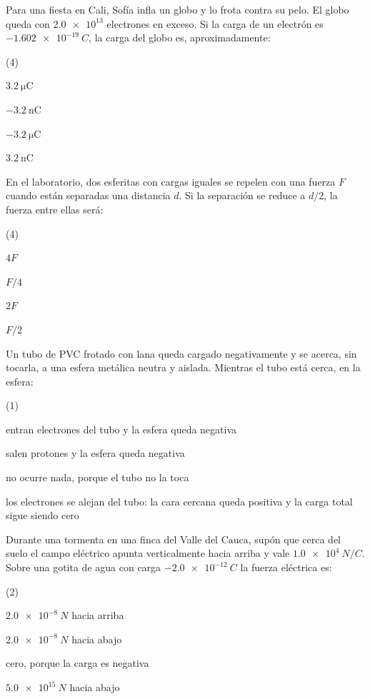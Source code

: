 \documentclass[11pt]{article}
\begin{document}
\begin{preguntas}
\pregunta Para una fiesta en Cali, Sofía infla un globo y lo frota contra su
pelo. El globo queda con $\num{2,0e13}$ electrones en exceso. Si la carga de
un electrón es $\qty{-1,602e-19}{C}$, la carga del globo es,
aproximadamente:
\begin{opciones*}(4)
  \item $\qty{3,2}{\micro\coulomb}$
  \item $\qty{-3,2}{\nano\coulomb}$
  \item $\qty{-3,2}{\micro\coulomb}$
  \item $\qty{3,2}{\nano\coulomb}$
\end{opciones*}

\pregunta En el laboratorio, dos esferitas con cargas iguales se repelen con
una fuerza $F$ cuando están separadas una distancia $d$. Si la separación se
reduce a $d/2$, la fuerza entre ellas será:
\begin{opciones*}(4)
  \item $4F$
  \item $F/4$
  \item $2F$
  \item $F/2$
\end{opciones*}

\pregunta Un tubo de PVC frotado con lana queda cargado negativamente y se
acerca, sin tocarla, a una esfera metálica neutra y aislada. Mientras el tubo
está cerca, en la esfera:
\begin{opciones*}(1)
  \item entran electrones del tubo y la esfera queda negativa
  \item salen protones y la esfera queda negativa
  \item no ocurre nada, porque el tubo no la toca
  \item los electrones se alejan del tubo: la cara cercana queda positiva y la
        carga total sigue siendo cero
\end{opciones*}

\pregunta Durante una tormenta en una finca del Valle del Cauca, supón que
cerca del suelo el campo eléctrico apunta verticalmente hacia arriba y vale
$\qty{1,0e4}{N/C}$. Sobre una gotita de agua con carga $\qty{-2,0e-12}{C}$ la
fuerza eléctrica es:
\begin{opciones*}(2)
  \item $\qty{2,0e-8}{N}$ hacia arriba
  \item $\qty{2,0e-8}{N}$ hacia abajo
  \item cero, porque la carga es negativa
  \item $\qty{5,0e15}{N}$ hacia abajo
\end{opciones*}
\end{preguntas}
\end{document}
